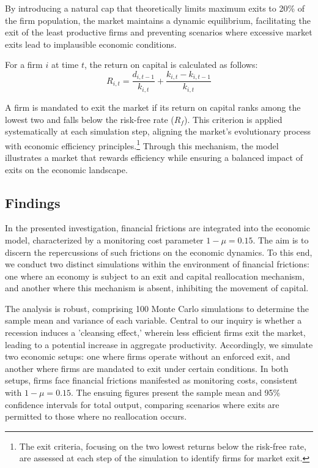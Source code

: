 \documentclass[12pt]{report}
\begin{document}
By introducing a natural cap that theoretically limits maximum exits to 20\% of the firm population, the market
maintains a dynamic equilibrium, facilitating the exit of the least productive firms and preventing scenarios where
excessive market exits lead to implausible economic conditions.

For a firm \(i\) at time \(t\), the return on capital is calculated as follows:
\begin{equation}
    R_{i,t} = \frac{d_{i,t-1}}{k_{i,t}} + \frac{k_{i,t}-k_{i,t-1}}{k_{i,t}} 
\end{equation}

A firm is mandated to exit the market if its return on capital ranks among the lowest two and falls below the risk-free
rate (\(R_f\)). This criterion is applied systematically at each simulation step, aligning the market's evolutionary
process with economic efficiency principles.\footnote{The exit criteria, focusing on the two lowest returns below the
risk-free rate, are assessed at each step of the simulation to identify firms for market exit.} Through this mechanism,
the model illustrates a market that rewards efficiency while ensuring a balanced impact of exits on the economic
landscape. 


\subsection{Findings}

In the presented investigation, financial frictions are integrated into the economic model, characterized by a monitoring cost
parameter \(1-\mu = 0.15\). The aim is to discern the repercussions of such frictions on the economic dynamics. To this
end, we conduct two distinct simulations within the environment of financial frictions: one where an economy is subject
to an exit and capital reallocation mechanism, and another where this mechanism is absent, inhibiting the movement of
capital. 

The analysis is robust, comprising 100 Monte Carlo simulations to determine the sample mean and variance of each
variable. Central to our inquiry is whether a recession induces a 'cleansing effect,' wherein less efficient firms exit
the market, leading to a potential increase in aggregate productivity. Accordingly, we simulate two economic setups: one
where firms operate without an enforced exit, and another where firms are mandated to exit under certain conditions. In
both setups, firms face financial frictions manifested as monitoring costs, consistent with \(1-\mu=0.15\). The ensuing figures present the sample mean and 95\%
confidence intervals for total output, comparing scenarios where exits are permitted to those where no reallocation
occurs.
\end{document}
